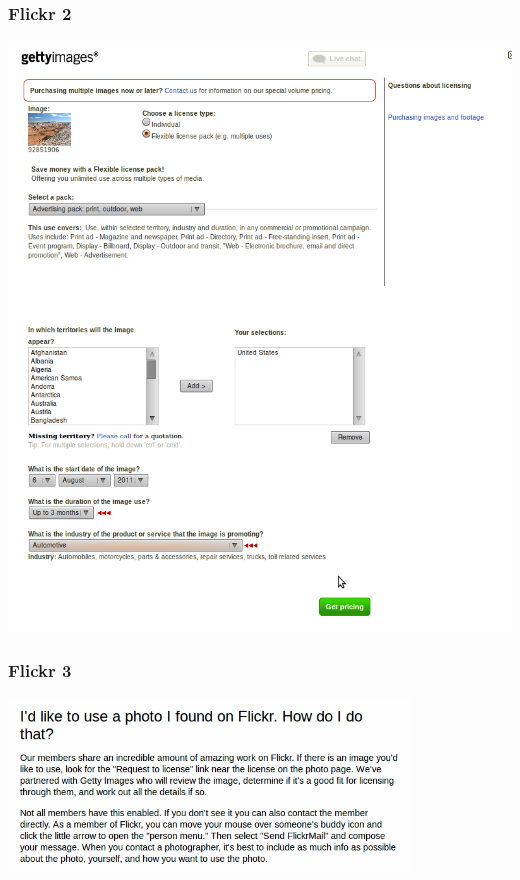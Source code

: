 \documentclass[mathserif,xcolor=dvipsnames,hyperref={bookmarks=true}]{beamer}
\begin{document}
    \begin{frame}[t]
        \frametitle{Flickr 2}
        \begin{center}
            \includegraphics[height=0.8\textheight]{gettyimages-pricing.png}
        \end{center}
    \end{frame}
    \begin{frame}[t]
        \frametitle{Flickr 3}
        \begin{center}
            \includegraphics[width=0.8\textwidth]{i-would-like-to-use-a-photo-i-found-on-flickr.png}
        \end{center}
    \end{frame}
\end{document}
